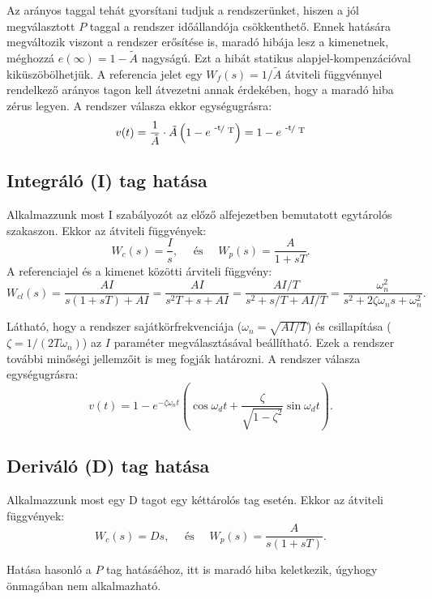 Az arányos taggal tehát gyorsítani tudjuk a rendszerünket, hiszen a jól
megválasztott $P$ taggal a rendszer időállandója csökkenthető. Ennek hatására
megváltozik viszont a rendszer erősítése is, maradó hibája lesz a kimenetnek,
méghozzá $e(\infty) = 1 - \tilde A$ nagyságú. Ezt a hibát statikus
alapjel-kompenzációval kiküszöbölhetjük. A referencia jelet egy $W_f(s) = 1 /
  \tilde A$ átviteli függvénnyel rendelkező arányos tagon kell átvezetni annak
érdekében, hogy a maradó hiba zérus legyen. A rendszer válasza ekkor
egységugrásra:
\begin{equation}
  v(t)
  = \frac{1}{\tilde A} \cdot \tilde A \left( 1 - e^{\slashfrac{-t}{T}} \right)
  = 1 - e^{\slashfrac{-t}{T}}
  \label{eq:P-use-step}
\end{equation}

\subsection{Integráló (I) tag hatása}

Alkalmazzunk most I szabályozót az előző alfejezetben bemutatott egytárolós
szakaszon. Ekkor az átviteli függvények:
\begin{equation}
  W_c(s) = \frac{I}{s},
  \quad \text{ és } \quad
  W_p(s) = \frac{A}{1 + sT}
  .
  \label{eq:I-use-CP}
\end{equation}
A referenciajel és a kimenet közötti árviteli függvény:
\begin{equation}
  W_{cl}(s)
  = \frac{AI}{s(1 + sT) + AI}
  = \frac{AI}{s^2 T + s + AI}
  = \frac{AI / T}{s ^ 2 + s / T + AI / T}
  = \frac{\omega_n^2}{s^2 + 2 \zeta \omega_n s + \omega_n^2}
  .
  \label{eq:I-use-cl}
\end{equation}

Látható, hogy a rendszer sajátkörfrekvenciája ($\omega_n = \sqrt{AI / T}$) és
csillapítása ($\zeta = 1 / (2 T \omega_n)$) az $I$ paraméter
megválasztásával beállítható. Ezek a rendszer további minőségi jellemzőit
is meg fogják határozni. A rendszer válasza egységugrásra:
\begin{equation}
  v(t)
  = 1 - e^{-\zeta \omega_n t} \left(
  \cos \omega_d t + \frac{\zeta}{\sqrt{1 - \zeta^2}}  \sin \omega_d t
  \right)
  .
  \label{eq:I-use-step}
\end{equation}

\subsection{Deriváló (D) tag hatása}

Alkalmazzunk most egy D tagot egy kéttárolós tag esetén. Ekkor az átviteli
függvények:
\begin{equation}
  W_c(s) = Ds,
  \quad \text{ és } \quad
  W_p(s) = \frac{A}{s (1 + sT)}
  .
  \label{eq:D-use-CP}
\end{equation}

Hatása hasonló a $P$ tag hatásáéhoz, itt is maradó hiba keletkezik, úgyhogy
önmagában nem alkalmazható.
